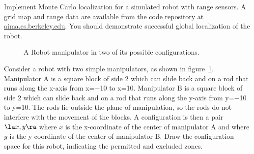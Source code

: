 \begin{exercise}\prgex%
Implement Monte Carlo localization for a simulated robot  with range
sensors.  A grid map and range data are available from the code repository
at \url{aima.cs.berkeley.edu}.
You should demonstrate successful global
localization of the robot.
\end{exercise} 





\begin{figure}
\caption{A Robot manipulator in two of its possible configurations.}
\label{figRobot2}
\end{figure}

\begin{exercise}[AB-manipulator-ex]
Consider a robot with two simple manipulators, as shown in 
figure~\ref{figRobot2}.
Manipulator A is a square block of side 2 
which can slide back and on a rod that
runs along the x-axis from x=$-$10 to x=10. 
Manipulator B is a square block of side 2 
which can slide back and on a rod that
runs along the y-axis from y=$-$10 to y=10. 
The rods lie outside the plane of manipulation, so 
the rods do not interfere with the movement of the blocks.
A configuration is then a pair $\la x,y\ra$ 
where $x$ is the x-coordinate of the center of manipulator A and 
where $y$ is the y-coordinate
of the center of manipulator B.
Draw the configuration space for this robot, indicating the permitted and
excluded zones.
\end{exercise} 


